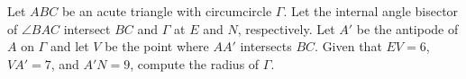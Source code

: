 Let $ABC$ be an acute triangle with circumcircle $\Gamma$. Let the internal angle bisector of $\angle BAC$ intersect $BC$ and $\Gamma$ at $E$ and $N$, respectively. Let $A'$ be the antipode of $A$ on $\Gamma$ and let $V$ be the point where $AA'$ intersects $BC$. Given that $EV=6$, $VA'=7$, and $A'N=9$, compute the radius of $\Gamma$.

